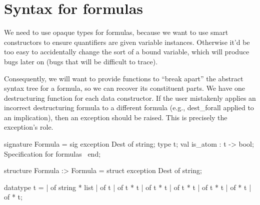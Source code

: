 \section{Syntax for formulas}

\begin{node}
We need to use opaque types for formulas, because we want to use smart
constructors to ensure quantifiers are given variable {\Tt{}\nwendquote} instances.
Otherwise it'd be too easy to accidentally change the sort of a bound
variable, which will produce bugs later on (bugs that will be
difficult to trace).

Consequently, we will want to provide  functions
to ``break apart'' the abstract syntax tree for a formula, so we can
recover its constituent parts. We have one destructuring function for
each data constructor. If the user mistakenly applies an incorrect
destructuring formula to a different formula (e.g., {\Tt{}dest{\_}forall\nwendquote}
applied to an implication), then an exception should be raised. This
is precisely the {\Tt{}\nwendquote} exception's role.
\end{node}

\nwenddocs{}\endmoddef\nwstartdeflinemarkup\nwenddeflinemarkup
signature Formula = sig
  exception Dest of string;
  type t;
  val is_atom : t -> bool;
  \LA{}Specification for formulas~{\nwtagstyle{}}\RA{}
end;
\nwendcode{}\nwdocspar

\nwenddocs{}\endmoddef\nwstartdeflinemarkup\nwenddeflinemarkup
structure Formula :> Formula = struct
exception Dest of string;

datatype t = 
           |  of string *  list
           |  of t
           |  of t * t
           |  of t * t
           |  of t * t
           |  of t * t
           |  of  * t
           |  of  * t;

